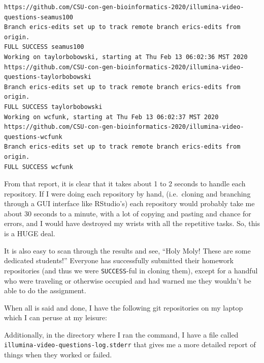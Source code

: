 \documentclass[]{krantz}
\makeatletter
\newenvironment{Shaded}{\begin{snugshade}}{\end{snugshade}}
\newcommand{\ExtensionTok}[1]{#1}
\newcommand{\NormalTok}[1]{#1}
\newenvironment{kframe}{%
\medskip{}
\setlength{\fboxsep}{.8em}
 \def\at@end@of@kframe{}%
 \ifinner\ifhmode%
  \def\at@end@of@kframe{\end{minipage}}%
  \begin{minipage}{\columnwidth}%
 \fi\fi%
 \def\FrameCommand##1{\hskip\@totalleftmargin \hskip-\fboxsep
 \colorbox{shadecolor}{##1}\hskip-\fboxsep
     \hskip-\linewidth \hskip-\@totalleftmargin \hskip\columnwidth}%
 \MakeFramed {\advance\hsize-\width
   \@totalleftmargin\z@ \linewidth\hsize
   \@setminipage}}%
 {\par\unskip\endMakeFramed%
 \at@end@of@kframe}
\renewenvironment{Shaded}{\begin{kframe}}{\end{kframe}}
\makeatother
\begin{document}
\begin{verbatim}
https://github.com/CSU-con-gen-bioinformatics-2020/illumina-video-questions-seamus100
Branch erics-edits set up to track remote branch erics-edits from origin.
FULL SUCCESS seamus100
Working on taylorbobowski, starting at Thu Feb 13 06:02:36 MST 2020
https://github.com/CSU-con-gen-bioinformatics-2020/illumina-video-questions-taylorbobowski
Branch erics-edits set up to track remote branch erics-edits from origin.
FULL SUCCESS taylorbobowski
Working on wcfunk, starting at Thu Feb 13 06:02:37 MST 2020
https://github.com/CSU-con-gen-bioinformatics-2020/illumina-video-questions-wcfunk
Branch erics-edits set up to track remote branch erics-edits from origin.
FULL SUCCESS wcfunk
\end{verbatim}

From that report, it is clear that it takes about 1 to 2 seconds to handle each
repository. If I were doing each repository by hand, (i.e.~cloning and
branching through a GUI
interface like RStudio's) each repository would probably take me about 30 seconds
to a minute, with a lot of copying and pasting and chance for errors,
and I would have destroyed my wrists with all the repetitive tasks. So, this
is a HUGE deal.

It is also easy to scan through the results and see, ``Holy Moly! These are
some dedicated students!'' Everyone has successfully submitted their homework repositories
(and thus we were \texttt{SUCCESS}-ful in cloning them), except for a handful
who were traveling or otherwise occupied and had warned me they wouldn't
be able to do the assignment.

When all is said and done, I have the following git repositories on my laptop which
I can peruse at my leisure:

\begin{Shaded}
\end{Shaded}

Additionally, in the directory where I ran the command, I have a
file called \texttt{illumina-video-questions-log.stderr} that gives me a more detailed
report of things when they worked or failed.
\end{document}
